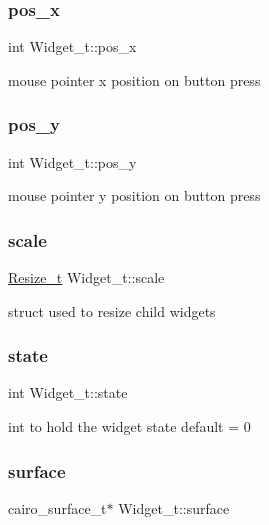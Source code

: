 \subsubsection{\texorpdfstring{pos\+\_\+x}{pos\_x}}
{\footnotesize\ttfamily int Widget\+\_\+t\+::pos\+\_\+x}

mouse pointer x position on button press \mbox{\label{structWidget__t_a9b127ac6b3f017b367351ee673e063c3}} 
\subsubsection{\texorpdfstring{pos\+\_\+y}{pos\_y}}
{\footnotesize\ttfamily int Widget\+\_\+t\+::pos\+\_\+y}

mouse pointer y position on button press \mbox{\label{structWidget__t_a9a2d5b53f40f5bf3914fc0694027d7ec}} 
\subsubsection{\texorpdfstring{scale}{scale}}
{\footnotesize\ttfamily \hyperlink{structResize__t}{Resize\+\_\+t} Widget\+\_\+t\+::scale}

struct used to resize child widgets \mbox{\label{structWidget__t_aaa935b64805fdeb78acb015c67d6638c}} 
\subsubsection{\texorpdfstring{state}{state}}
{\footnotesize\ttfamily int Widget\+\_\+t\+::state}

int to hold the widget state default = 0 \mbox{\label{structWidget__t_ae9b5979742ea31817ff7d7b34a56f88d}} 
\subsubsection{\texorpdfstring{surface}{surface}}
{\footnotesize\ttfamily cairo\+\_\+surface\+\_\+t$\ast$ Widget\+\_\+t\+::surface}

